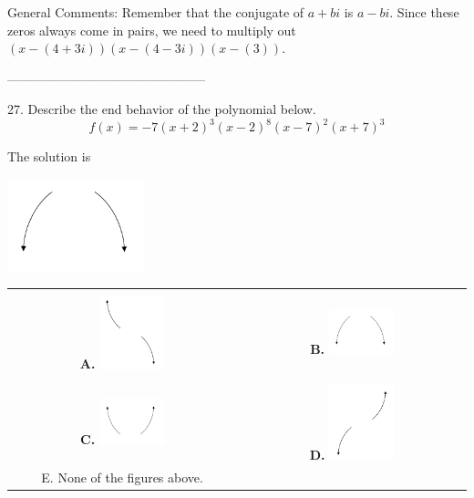 \documentclass{article}[14pt]
\begin{document}
General Comments: Remember that the conjugate of $a+bi$ is $a-bi$. Since these zeros always come in pairs, we need to multiply out $(x-(4 + 3i))(x-(4 - 3i))(x-(3))$.

-----------------------------------------------

27. Describe the end behavior of the polynomial below.
$$ f(x) = -7(x + 2)^{3}(x - 2)^{8}(x - 7)^{2}(x + 7)^{3} $$ 

 
 The solution is  
 \begin{center} \includegraphics[width=0.3\textwidth]{../Figures/endBehaviorNegativeEvenC.png} \end{center}\begin{tabular}{|c|c|} 
\hline 
 & \tabularnewline 
 \textbf{A.} \includegraphics[width=0.3\textwidth]{../Figures/endBehaviorNegativeOddC.png} & \textbf{B.} \includegraphics[width=0.3\textwidth]{../Figures/endBehaviorNegativeEvenC.png} \tabularnewline 
\hline 
 & \tabularnewline 
 \textbf{C.} \includegraphics[width=0.3\textwidth]{../Figures/endBehaviorPositiveEvenC.png} & \textbf{D.} \includegraphics[width=0.3\textwidth]{../Figures/endBehaviorPositiveOddC.png} \tabularnewline 
\hline 
 E. None of the figures above. & \tabularnewline 
\hline 
 \end{tabular} 
 
\end{document}
